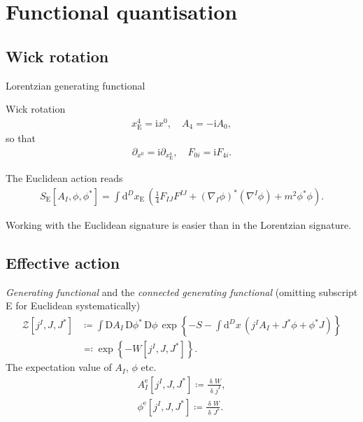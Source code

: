 \documentclass[12pt]{article}
\newcommand\mi{\mathrm{i}} %
\newcommand\dif{\mathrm{d}}
\newcommand\Dif{\mathrm{D}}
\newcommand\dva{\updelta}
\newcommand{\rbr}[1]{{\left(#1\right)}}
\newcommand{\sfun}[2]{{#1}\mathopen{}\left[#2\right]\mathclose{}}
\newcommand{\cfun}[2]{{#1}\mathopen{}\left\{#2\right\}\mathclose{}}
\newcommand{\frdva}[2]{{\frac{\dva{#1}}{\dva{#2}}}}
\begin{document}
\section{Functional quantisation}
\label{sec:gen-fun}


\subsection{Wick rotation}


Lorentzian generating functional

Wick rotation
\begin{align}
x_\text{E}^4 = \mi x^0,\quad A_4 = -\mi A_0,
\end{align}
so that
\begin{align}
\partial_{x^0} = \mi \partial_{x_\text{E}^4},\quad
F_{0i} = \mi F_{4i}.
\end{align}

The Euclidean action reads
\begin{align}
\sfun{S_\text{E}}{A_I,\phi,\phi^*} = \int \dif^{D} x_\text{E}\,\rbr{
	\frac{1}{4} F_{IJ} F^{IJ} + \rbr{\nabla_{\!I}\phi}^* \rbr{\nabla^I \phi} 
	+ m^2 \phi^* \phi}.
\end{align}


Working with the Euclidean signature is easier than in the Lorentzian 
signature.

\subsection{Effective action}
\label{ssec:gen-fun-eff-act}

\emph{Generating functional} and the \emph{connected generating functional} 
(omitting subscript E for Euclidean systematically)
\begin{align}
\sfun{\mathcal{Z}}{j^I, J, J^*} &\coloneqq
\int\Dif A_I\,\Dif\phi^*\,\Dif\phi\,
	\cfun{\exp}{- S - \int\dif^{D} x\,\rbr{j^I A_I + J^* \phi+\phi^* J}}
\\
&\eqqcolon \cfun{\exp}{-\sfun{W}{j^I, J, J^*}}.
\end{align}
The expectation value of $A_I$, $\phi$ etc.
\begin{align}
	\sfun{A^\text{e}_I}{j^I, J, J^*} \coloneqq \frdva{W}{j^I},
	\\
	\sfun{\phi^\text{e}}{j^I, J, J^*} \coloneqq \frdva{W}{J^*}.
\end{align}
\end{document}
